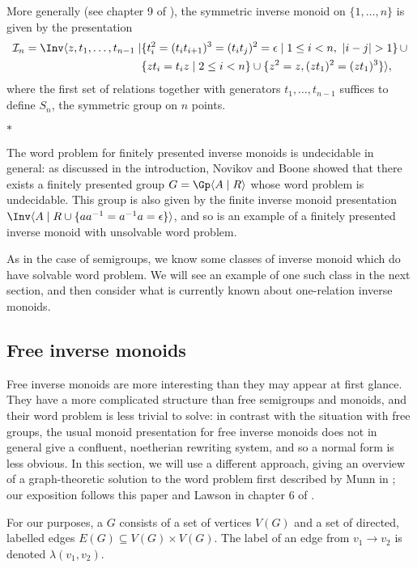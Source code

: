 \documentclass[noindex,noinsetproof,emphthm,12pt]{lmaths}
\newcommand{\paradec}{\par\begin{center}$\ast$\end{center}}
\begin{document}
More generally (see chapter 9 of \cite{Lipscomb1996}), the symmetric inverse monoid on $\{1, \ldots, n\}$ is given by the presentation
\begin{align*}
	\mathcal{I}_n = \Inv \langle z, t_1, \ldots, t_{n-1} \mid & \{ t_i^2 = (t_i t_{i+1})^3 = (t_i t_j)^2 = \epsilon \mid 1 \le i < n,\ |i-j|>1 \}\, \cup \\
	& \{ zt_i = t_iz \mid 2 \le i < n \} \cup \{ z^2 = z, (zt_1)^2 = (zt_1)^3 \} \rangle,
\end{align*}
where the first set of relations together with generators $t_1, \ldots, t_{n-1}$ suffices to define $S_n$, the symmetric group on $n$ points.


\paradec

The word problem for finitely presented inverse monoids is undecidable in general: as discussed in the introduction, Novikov and Boone showed that there exists a finitely presented group $G = \Gp \langle A \mid R \rangle$ whose word problem is undecidable. This group is also given by the finite inverse monoid presentation $\Inv \langle A \mid R \cup \{ aa^{-1} = a^{-1}a = \epsilon \} \rangle$, and so is an example of a finitely presented inverse monoid with unsolvable word problem.

As in the case of semigroups, we know some classes of inverse monoid which do have solvable word problem. We will see an example of one such class in the next section, and then consider what is currently known about one-relation inverse monoids. 

\subsection{Free inverse monoids} \label{sec:free-inverse-monoids}
Free inverse monoids are more interesting than they may appear at first glance. They have a more complicated structure than free semigroups and monoids, and their word problem is less trivial to solve: in contrast with the situation with free groups, the usual monoid presentation for free inverse monoids does not in general give a confluent, noetherian rewriting system, and so a normal form is less obvious. In this section, we will use a different approach, giving an overview of a graph-theoretic solution to the word problem first described by Munn in \cite{Munn1974}; our exposition follows this paper and Lawson in chapter 6 of \cite{Lawson1998}.

For our purposes, a  $G$ consists of a set of vertices $V(G)$ and a set of directed, labelled edges $E(G) \subseteq V(G) \times V(G)$. The label of an edge from $v_1 \to v_2$ is denoted $\lambda(v_1, v_2)$.
\end{document}

